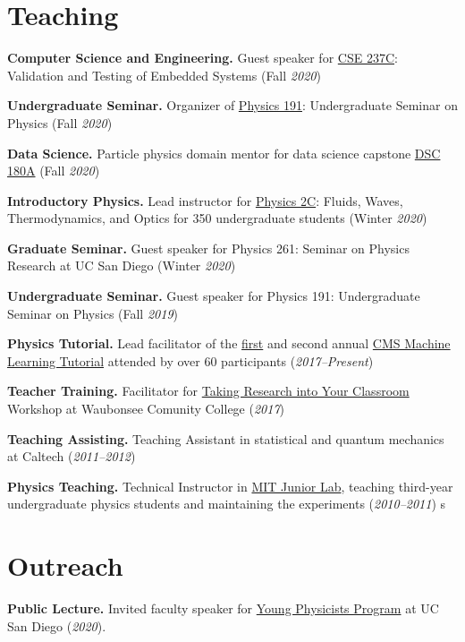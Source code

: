 \documentclass[11pt]{res}
\newcommand{\MarginText}[1]{\section{#1}\vspace{10pt}}
\begin{document}
\begin{resume}
\MarginText{Teaching}

\textbf{Computer Science and Engineering.} Guest speaker for \href{http://kastner.ucsd.edu/ryan/cse237c/}{CSE 237C}: Validation and Testing of Embedded Systems (Fall \textit{2020})

\textbf{Undergraduate Seminar.} Organizer of \href{https://indico.cern.ch/event/956641/}{Physics 191}: Undergraduate Seminar on Physics (Fall \textit{2020})

\textbf{Data Science.} Particle physics domain mentor for data science capstone \href{https://jmduarte.github.io/capstone-particle-physics-domain}{DSC 180A} (Fall \textit{2020})

\textbf{Introductory Physics.} Lead instructor for \href{https://jduarte.physics.ucsd.edu/phys2c/index.html}{Physics 2C}: Fluids, Waves, Thermodynamics, and Optics for 350 undergraduate students (Winter \textit{2020})

\textbf{Graduate Seminar.} Guest speaker for Physics 261: Seminar on Physics Research at UC San Diego (Winter \textit{2020})

\textbf{Undergraduate Seminar.} Guest speaker for Physics 191: Undergraduate Seminar on Physics (Fall \textit{2019})

\textbf{Physics Tutorial.} Lead facilitator of the \href{https://indico.cern.ch/event/628146/}{first} and second annual \href{https://indico.cern.ch/event/726984/}{CMS Machine Learning Tutorial} attended by over 60 participants (\textit{2017--Present})

\textbf{Teacher Training.} Facilitator for \href{http://eddata.fnal.gov/lasso/program_search/show_workshopID_new.lasso?event_id=435}{Taking  Research into Your Classroom} Workshop at Waubonsee Comunity College (\textit{2017})

\textbf{Teaching Assisting.} Teaching Assistant in statistical and quantum mechanics at Caltech (\textit{2011--2012})

\textbf{Physics Teaching.} Technical Instructor in \href{http://web.mit.edu/8.13/www/index.shtml}{MIT Junior Lab}, teaching third-year undergraduate physics students and maintaining the experiments (\textit{2010--2011}) s


  \MarginText{Outreach}

\textbf{Public Lecture.} Invited faculty speaker for \href{http://ypp.ucsd.edu/}{Young Physicists Program} at UC
San Diego (\textit{2020}).


\end{resume}
\end{document}
